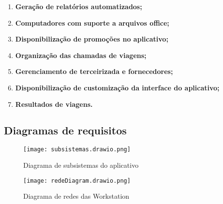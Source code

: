 \begin{enumerate}

      \item \textbf{Geração de relatórios automatizados;}
      \item \textbf{Computadores com suporte a arquivos office;}
      \item \textbf{Disponibilização de promoções no aplicativo;}
      \item \textbf{Organização das chamadas de viagens;}
      \item \textbf{Gerenciamento de terceirizada e fornecedores; }
      \item \textbf{Disponibilização de customização da interface do aplicativo;}
      \item \textbf{Resultados de viagens.}
























\end{enumerate}

\subsection{Diagramas de requisitos}
\begin{figure}[H]
      \begin{center}
            \caption{Diagrama de subsistemas do aplicativo} \label{afp}
            \texttt{[image: subsistemas.drawio.png]} \\
      \end{center}
\end{figure}
\begin{figure}[H]
      \begin{center}
            \caption{ Diagrama de redes das Workstation} \label{afp}
            \texttt{[image: redeDiagram.drawio.png]} \\
      \end{center}
\end{figure}

